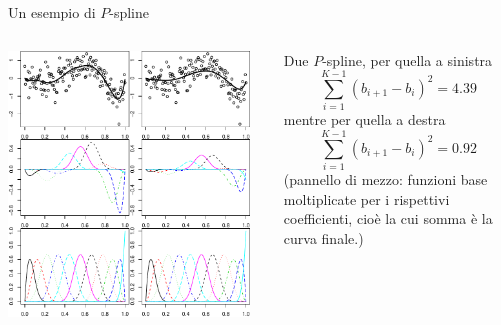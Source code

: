 \documentclass{beamer}\usepackage[]{graphicx}\usepackage[]{color}
\newenvironment{knitrout}{}{} %
\begin{document}
\begin{frame}{Un esempio di $P$-spline}
\begin{columns}
\begin{knitrout}
\color{fgcolor}
\includegraphics[width=0.95\textwidth]{figure/020-regression-1unnamed-chunk-37-1} 

\end{knitrout}
Due $P$-spline, per quella a  sinistra
\[ \sum_{i=1}^{K-1} (b_{i+1}-b_i)^2= 4.39 \]
mentre per quella a destra
\[ \sum_{i=1}^{K-1} (b_{i+1}-b_i)^2= 0.92 \]
(pannello di mezzo: funzioni base moltiplicate per i rispettivi coefficienti, cio\`e la cui somma \`e la curva finale.)
\end{columns}
\end{frame}
\end{document}

